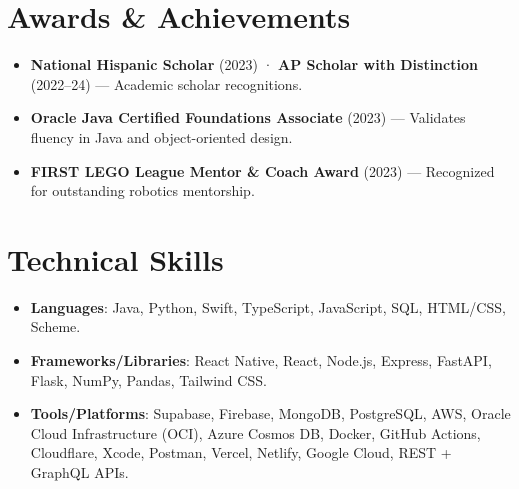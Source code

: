 \documentclass[letterpaper,11pt]{article}
\newcommand{\resumeItem}[2]{\item\small{\textbf{#1}{: #2 \vspace{-1pt}}}}
\newcommand{\resumeItemNH}[1]{\item\small{{#1 \vspace{-1pt}}}}
\newcommand{\resumeSubHeadingListStart}{\begin{itemize}[leftmargin=*,label={}]}
\newcommand{\resumeSubHeadingListEnd}{\end{itemize}}
\begin{document}
\section{Awards \& Achievements}
\resumeSubHeadingListStart
  \resumeItemNH{\textbf{National Hispanic Scholar} (2023) · \textbf{AP Scholar with Distinction} (2022–24) — Academic scholar recognitions.}
  \resumeItemNH{\textbf{Oracle Java Certified Foundations Associate} (2023) — Validates fluency in Java and object-oriented design.}
\resumeItemNH{\textbf{FIRST LEGO League Mentor \& Coach Award} (2023) — Recognized for outstanding robotics mentorship.}
\resumeSubHeadingListEnd

\section{Technical Skills}
\resumeSubHeadingListStart
\resumeItem{Languages}{Java, Python, Swift, TypeScript, JavaScript, SQL, HTML/CSS, Scheme.}
\resumeItem{Frameworks/Libraries}{React Native, React, Node.js, Express, FastAPI, Flask, NumPy, Pandas, Tailwind CSS.}
\resumeItem{Tools/Platforms}{Supabase, Firebase, MongoDB, PostgreSQL, AWS, Oracle Cloud Infrastructure (OCI), Azure Cosmos DB, Docker, GitHub Actions, Cloudflare, Xcode, Postman, Vercel, Netlify, Google Cloud, REST + GraphQL APIs.}
  \resumeSubHeadingListEnd
\end{document}

